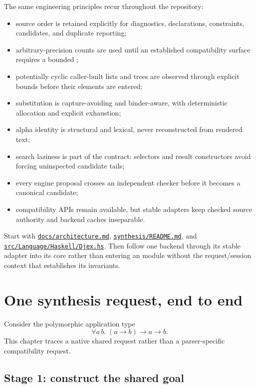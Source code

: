 \documentclass[10pt,letterpaper,oneside]{report}
\newcommand{\code}[1]{\texttt{\detokenize{#1}}}
\def\DjexBase{https://github.com/VladimirReshetnikov/Djex/blob/d3d9662598460316bdcd177ce6768c521e764aa8/}
\newcommand{\dpath}[1]{\href{\DjexBase#1}{\nolinkurl{#1}}}
\begin{document}
The same engineering principles recur throughout the repository:

\begin{itemize}
  \item source order is retained explicitly for diagnostics, declarations, constraints, candidates, and duplicate reporting;
  \item arbitrary-precision counts are used until an established compatibility surface requires a bounded \code{Int};
  \item potentially cyclic caller-built lists and trees are observed through explicit bounds before their elements are entered;
  \item substitution is capture-avoiding and binder-aware, with deterministic allocation and explicit exhaustion;
  \item alpha identity is structural and lexical, never reconstructed from rendered text;
  \item search laziness is part of the contract: selectors and result constructors avoid forcing uninspected candidate tails;
  \item every engine proposal crosses an independent checker before it becomes a canonical candidate;
  \item compatibility APIs remain available, but stable adapters keep checked source authority and backend caches inseparable.
\end{itemize}

\begin{sourcebox}
Start with \dpath{docs/architecture.md}, \dpath{synthesis/README.md}, and \dpath{src/Language/Haskell/Djex.hs}. Then follow one backend through its stable adapter into its core rather than entering an \code{Internal} module without the request/session context that establishes its invariants.
\end{sourcebox}

\chapter{One synthesis request, end to end}\label{ch:djex-query-lifecycle}

Consider the polymorphic application type
\[
  \forall a\,b.\;(a \to b) \to a \to b.
\]
This chapter traces a native shared request rather than a parser-specific compatibility request.

\section{Stage 1: construct the shared goal}
\end{document}
